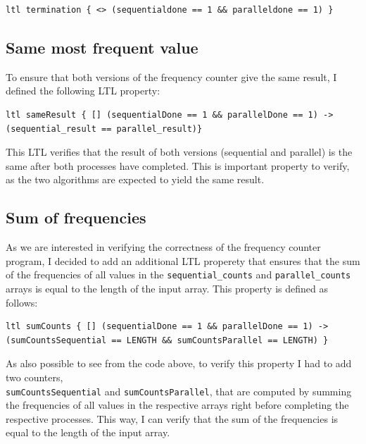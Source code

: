 \documentclass[a4paper, 11pt]{article}
\begin{document}
\begin{lstlisting}[language=Promela, caption={LTL property to verify the completition of both sequential and parallel processes}, captionpos=b, breaklines=true]
ltl termination { <> (sequentialdone == 1 && paralleldone == 1) }
\end{lstlisting}

\subsection{Same most frequent value}
\label{sec:ltl_same_result}

To ensure that both versions of the frequency counter give the same result, I defined the following LTL property:

\begin{lstlisting}[language=Promela, caption={LTL property to verify that both versions of the frequency counter give the same result}]
ltl sameResult { [] (sequentialDone == 1 && parallelDone == 1) -> (sequential_result == parallel_result)}
\end{lstlisting}

This LTL verifies that the result of both versions (sequential and parallel) is the same after both processes have completed. This is important property to verify, as the two algorithms are expected to yield the same result.

\subsection{Sum of frequencies}

As we are interested in verifying the correctness of the frequency counter program, I decided to add an additional LTL properety that ensures that the sum of the frequencies of all values in the \texttt{sequential\_counts} and \texttt{parallel\_counts} arrays is equal to the length of the input array. This property is defined as follows:

\begin{lstlisting}[language=Promela, caption={LTL properties to verify the sum of frequencies in the sequential and parallel arrays}, captionpos=b, breaklines=true]
ltl sumCounts { [] (sequentialDone == 1 && parallelDone == 1) -> (sumCountsSequential == LENGTH && sumCountsParallel == LENGTH) }
\end{lstlisting}

As also possible to see from the code above, to verify this property I had to add two counters, \\ \texttt{sumCountsSequential} and \texttt{sumCountsParallel}, that are computed by summing the frequencies of all values in the respective arrays right before completing the respective processes. This way, I can verify that the sum of the frequencies is equal to the length of the input array.
\end{document}
